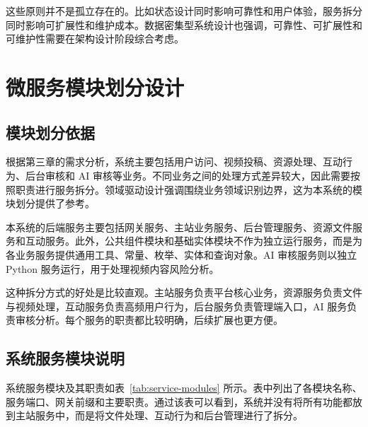 这些原则并不是孤立存在的。比如状态设计同时影响可靠性和用户体验，服务拆分同时影响可扩展性和维护成本。数据密集型系统设计也强调，可靠性、可扩展性和可维护性需要在架构设计阶段综合考虑\cite{kleppmann2017ddia}。

\section{微服务模块划分设计}
\label{sec:microservice-module-design}

\subsection{模块划分依据}
\label{subsec:module-splitting-basis}

根据第三章的需求分析，系统主要包括用户访问、视频投稿、资源处理、互动行为、后台审核和 AI 审核等业务。不同业务之间的处理方式差异较大，因此需要按照职责进行服务拆分。领域驱动设计强调围绕业务领域识别边界，这为本系统的模块划分提供了参考\cite{evans2003ddd}。

本系统的后端服务主要包括网关服务、主站业务服务、后台管理服务、资源文件服务和互动服务。此外，公共组件模块和基础实体模块不作为独立运行服务，而是为各业务服务提供通用工具、常量、枚举、实体和查询对象。AI 审核服务则以独立 Python 服务运行，用于处理视频内容风险分析。

这种拆分方式的好处是比较直观。主站服务负责平台核心业务，资源服务负责文件与视频处理，互动服务负责高频用户行为，后台服务负责管理端入口，AI 服务负责审核分析。每个服务的职责都比较明确，后续扩展也更方便。

\subsection{系统服务模块说明}
\label{subsec:service-module-description}

系统服务模块及其职责如表~\ref{tab:service-modules} 所示。表中列出了各模块名称、服务端口、网关前缀和主要职责。通过该表可以看到，系统并没有将所有功能都放到主站服务中，而是将文件处理、互动行为和后台管理进行了拆分。

